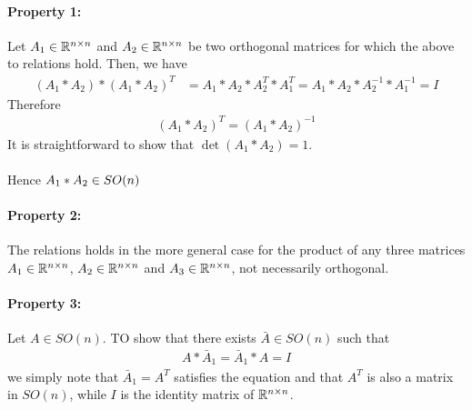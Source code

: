 \paragraph{Property 1:}  Let $A_1\in \mathbb{R}^{n\times n}$ and $A_2\in \mathbb{R}^{n\times n}$ be two orthogonal matrices for which the above to relations hold. Then, we have
\begin{align*}
(A_1*A_2)*(A_1*A_2)^T &= A_1*A_2 * A_2^T*A_1^T = A_1*A_2 * A_2^{-1}*A_1^{-1}= I
\end{align*}
Therefore 
\begin{align*}
(A_1*A_2)^T = (A_1*A_2)^{-1} 
\end{align*}
It is straightforward to show that $\det(A_1*A_2) = 1$.\\~\\
Hence $A_1*A_2 \in \space SO(n)$
\paragraph{Property 2:}  The relations holds in the more general case for the product of any three matrices $A_1\in \mathbb{R}^{n\times n}$, $A_2\in \mathbb{R}^{n\times n}$ and $A_3\in \mathbb{R}^{n\times n}$, not necessarily orthogonal.
\paragraph{Property 3:}  Let $A\in SO(n)$. TO show that there exists $\bar{A}\in SO(n)$ such that
\begin{align*}
A*\bar{A}_1 = \bar{A}_1*A = I 
\end{align*}
we simply note that $\bar{A}_1 = A^T$ satisfies the equation and that $A^T$ is also a matrix in $SO(n)$, while $I$ is the identity matrix of $\mathbb{R}^{n \times n}$.

